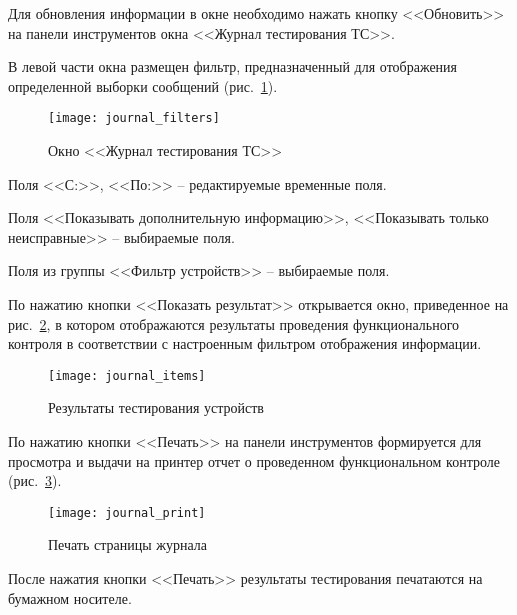 Для обновления информации в окне необходимо нажать кнопку <<Обновить>> на панели инструментов окна <<Журнал тестирования
ТС>>.

В левой части окна размещен фильтр, предназначенный для отображения определенной выборки сообщений
(рис.~\ref{fig:guide:user_guide:journal:journal_filters}).

\begin{figure}[!htb]
	\centering
	\texttt{[image: journal\_filters]}
	\caption{Окно <<Журнал тестирования ТС>>}
	\label{fig:guide:user_guide:journal:journal_filters}
\end{figure}

Поля <<С:>>, <<По:>> – редактируемые временные поля.

Поля <<Показывать дополнительную информацию>>, <<Показывать только неисправные>> – выбираемые поля.

Поля из группы <<Фильтр устройств>> – выбираемые поля.

По нажатию кнопки <<Показать результат>> открывается окно, приведенное на
рис.~\ref{fig:guide:user_guide:journal:journal_items}, в котором отображаются результаты проведения функционального контроля
в соответствии с настроенным фильтром отображения информации.
\begin{figure}[h]
	\centering
	\texttt{[image: journal\_items]}
	\caption{Результаты тестирования устройств}
	\label{fig:guide:user_guide:journal:journal_items}
\end{figure}

По нажатию кнопки <<Печать>> на панели инструментов формируется для просмотра и выдачи на принтер отчет о проведенном
функциональном контроле (рис.~\ref{fig:guide:user_guide:journal:journal_print}).
\begin{figure}[!htb]
	\centering
	\texttt{[image: journal\_print]}
	\caption{Печать страницы журнала}
	\label{fig:guide:user_guide:journal:journal_print}
\end{figure}

После нажатия кнопки <<Печать>> результаты тестирования печатаются на бумажном носителе.


